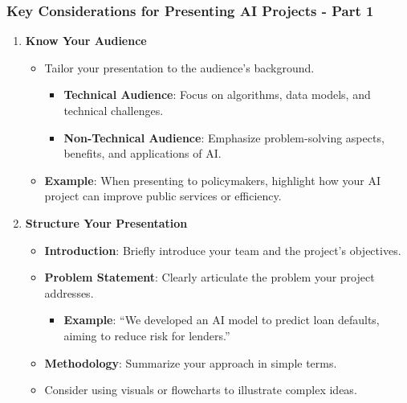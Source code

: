 \documentclass{beamer}
\begin{document}
\begin{frame}[fragile]
    \frametitle{Key Considerations for Presenting AI Projects - Part 1}
    \begin{enumerate}
        \item \textbf{Know Your Audience}
            \begin{itemize}
                \item Tailor your presentation to the audience’s background.
                    \begin{itemize}
                        \item \textbf{Technical Audience}: Focus on algorithms, data models, and technical challenges.
                        \item \textbf{Non-Technical Audience}: Emphasize problem-solving aspects, benefits, and applications of AI.
                    \end{itemize}
                \item \textbf{Example}: When presenting to policymakers, highlight how your AI project can improve public services or efficiency.
            \end{itemize}
        
        \item \textbf{Structure Your Presentation}
            \begin{itemize}
                \item \textbf{Introduction}: Briefly introduce your team and the project’s objectives.
                \item \textbf{Problem Statement}: Clearly articulate the problem your project addresses.
                    \begin{itemize}
                        \item \textbf{Example}: “We developed an AI model to predict loan defaults, aiming to reduce risk for lenders.”
                    \end{itemize}
                \item \textbf{Methodology}: Summarize your approach in simple terms.
                    \item Consider using visuals or flowcharts to illustrate complex ideas.
            \end{itemize}
    \end{enumerate}
\end{frame}
\end{document}
